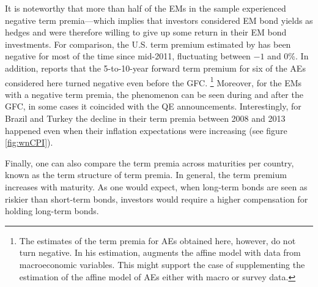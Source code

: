 {It is noteworthy that more than half of the EMs in the sample experienced negative term premia---which implies that investors considered EM bond yields as hedges and were therefore willing to give up some return in their EM bond investments.
For comparison, the U.S. term premium estimated by \cite{KimWright:2005} has been negative for most of the time since mid-2011, fluctuating between \(-1\) and \(0\)\%.
In addition, \cite{Wright:2011} reports that the 5-to-10-year forward term premium for six of the AEs considered here turned negative even before the GFC.
\footnote{ The estimates of the term premia for AEs obtained here, however, do not turn negative. In his estimation, \cite{Wright:2011} augments the affine model with data from macroeconomic variables. This might support the case of supplementing the estimation of the affine model of AEs either with macro or survey data.} 
Moreover, for the EMs with a negative term premia, the phenomenon can be seen during and after the GFC, in some cases it coincided with the QE announcements.
Interestingly, for Brazil and Turkey the decline in their term premia between 2008 and 2013 happened even when their inflation expectations were increasing (see figure \ref{fig:wnCPI}).

Finally, 
one can also compare the term premia across maturities per country, known as the term structure of term premia. In general, the term premium increases with maturity. As one would expect, when long-term bonds are seen as riskier than short-term bonds, investors would require a higher compensation for holding long-term bonds.

}
